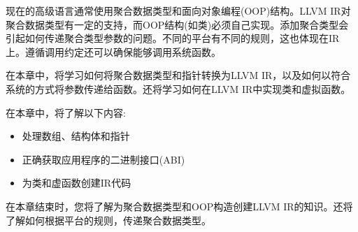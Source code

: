 
现在的高级语言通常使用聚合数据类型和面向对象编程(OOP)结构。LLVM IR对聚合数据类型有一定的支持，而OOP结构(如类)必须自己实现。添加聚合类型会引起如何传递聚合类型参数的问题。不同的平台有不同的规则，这也体现在IR上。遵循调用约定还可以确保能够调用系统函数。

在本章中，将学习如何将聚合数据类型和指针转换为LLVM IR，以及如何以符合系统的方式将参数传递给函数。还将学习如何在LLVM IR中实现类和虚拟函数。

在本章中，将了解以下内容:

\begin{itemize}
\item
处理数组、结构体和指针

\item
正确获取应用程序的二进制接口(ABI)

\item
为类和虚函数创建IR代码
\end{itemize}

在本章结束时，您将了解为聚合数据类型和OOP构造创建LLVM IR的知识。还将了解如何根据平台的规则，传递聚合数据类型。

































